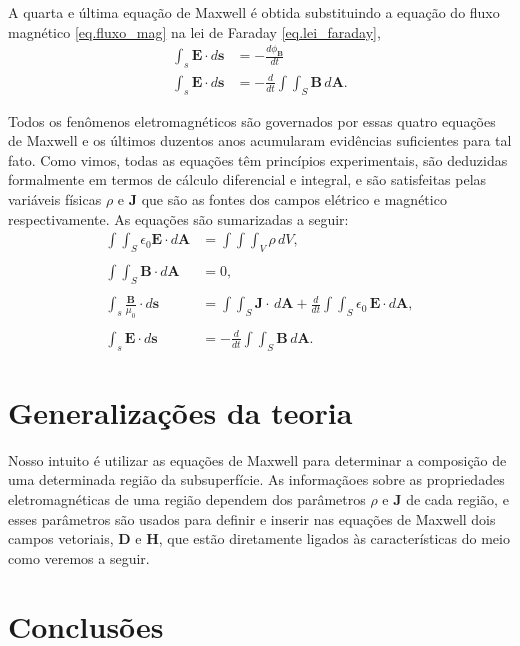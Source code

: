 A quarta e última equação de Maxwell é obtida substituindo a equação do fluxo magnético \ref{eq.fluxo_mag} na lei de Faraday \ref{eq.lei_faraday},
\begin{align*}
\int_s\pmb{E}\cdot d\pmb{s}&=-\frac{d\phi_\mathbf{B}}{dt}\\
\int_s\pmb{E}\cdot d\pmb{s}&=-\frac{d}{dt}\int\int_S\pmb{B}\,d\pmb{A}.
\end{align*}

Todos os fenômenos eletromagnéticos são governados por essas quatro equações de Maxwell  e os últimos duzentos anos acumularam evidências suficientes para tal fato. Como vimos, todas as equações têm princípios experimentais, são deduzidas formalmente em termos de cálculo diferencial e integral, e são satisfeitas pelas variáveis físicas $\rho$ e $\mathbf{J}$ que são as fontes dos campos elétrico e magnético respectivamente. As equações são sumarizadas a seguir:
\begin{align*}
\int\int_S\epsilon_0\textbf{E}\cdot\textit{d}\textbf{A}&=\int\int\int_{V}\rho\,dV,\\\\
\int\int_S\textbf{B}\cdot\textit{d}\textbf{A}&=0,\\\\
\int_s\frac{\mathbf{B}}{\mu_0}\cdot d\mathbf{s}&=\int\int_S\mathbf{J}\cdot\,d\mathbf{A}+\frac{d}{dt}\int\int_S\epsilon_0\,\textbf{E}\cdot\textit{d}\textbf{A},\\\\
\int_s\pmb{E}\cdot d\pmb{s}&=-\frac{d}{dt}\int\int_S\pmb{B}\,d\pmb{A}.
\end{align*}

\section{Generalizações da teoria}

Nosso intuito é utilizar as equações de Maxwell para determinar a composição de uma determinada região da subsuperfície. As informaçãoes sobre as propriedades eletromagnéticas de uma região dependem dos parâmetros $\rho$ e $\mathbf{J}$ de cada região, e esses parâmetros são usados para definir e inserir nas equações de Maxwell dois campos vetoriais, $\mathbf{D}$ e $\mathbf{H}$, que estão diretamente ligados às características do meio como veremos a seguir.



\section{Conclusões}